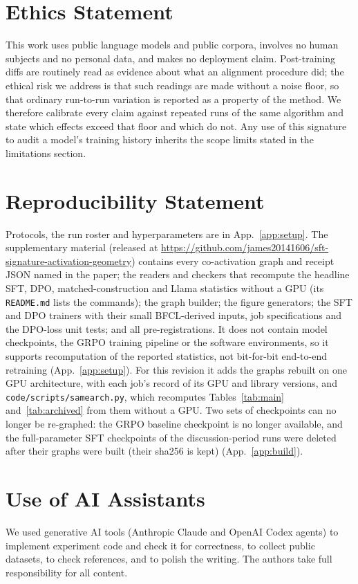 \documentclass{article}
\newcommand{\coderepo}{\url{https://github.com/james20141606/sft-signature-activation-geometry}}
\begin{document}


\section*{Ethics Statement}
This work uses public language models and public corpora, involves no human
subjects and no personal data, and makes no deployment claim. Post-training
diffs are routinely read as evidence about what an alignment procedure did; the
ethical risk we address is that such readings are made without a noise floor, so
that ordinary run-to-run variation is reported as a property of the method. We
therefore calibrate every claim against repeated runs of the same algorithm and
state which effects exceed that floor and which do not. Any use of this
signature to audit a model's training history inherits the scope limits stated
in the limitations section.

\section*{Reproducibility Statement}
Protocols, the run roster and hyperparameters are in App.~\ref{app:setup}. The
supplementary material (released at \coderepo) contains every co-activation graph and receipt
JSON named in the paper; the readers and checkers that recompute the headline
SFT, DPO, matched-construction and Llama statistics without a GPU (its
\texttt{README.md} lists the commands); the graph builder; the figure
generators; the SFT and DPO trainers with their small BFCL-derived inputs, job
specifications and the DPO-loss unit tests; and all pre-registrations. It does
not contain model checkpoints, the GRPO training pipeline or the software
environments, so it supports recomputation of the reported statistics, not
bit-for-bit end-to-end retraining (App.~\ref{app:setup}). For this revision it
adds the graphs rebuilt on one GPU architecture, with each job's record of its
GPU and library versions, and \texttt{code/scripts/samearch.py}, which
recomputes Tables~\ref{tab:main} and~\ref{tab:archived} from them without a GPU.
Two sets of checkpoints can no longer be re-graphed: the GRPO baseline
checkpoint is no longer available, and the full-parameter SFT checkpoints of
the discussion-period runs were deleted after their graphs were built (their
sha256 is kept) (App.~\ref{app:build}).

\section*{Use of AI Assistants}
We used generative AI tools (Anthropic Claude and OpenAI Codex agents) to implement experiment code
and check it for correctness, to collect public datasets, to check references, and to polish the
writing. The authors take full responsibility for all content.
\end{document}
